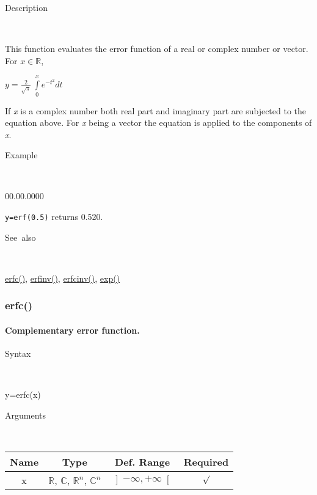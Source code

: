 \begin{description}
\item [Description]~
\end{description}
This function evaluates the error function of a real or complex number
or vector. For $x\in\mathbb{R}$,

\medskip{}
$y={\displaystyle \frac{2}{\sqrt{\pi}}\,\int\limits _{0}^{x}e^{-t^{2}}dt}$
\medskip{}

If \textit{x} is a complex number both real part and imaginary
part are subjected to the equation above. For \textit{x} being a vector
the equation is applied to the components of \textit{x}.

\begin{description}
\item [Example]~
\end{description}
\begin{lyxlist}{00.00.0000}
\item [\texttt{y=erf(0.5)}]returns 0.520.
\end{lyxlist}
\begin{description}
\item [See~also]~
\end{description}
\textcolor{blue}{\hyperlink{erfc}{erfc()}}\textcolor{black}{,} \textcolor{blue}{\hyperlink{erfinv}{erfinv()}}\textcolor{black}{,}
\textcolor{blue}{\hyperlink{erfcinv}{erfcinv()}}\textcolor{black}{,}
\textcolor{blue}{\hyperlink{exp}{exp()}}


\newpage
\subsubsection*{\hypertarget{erfc}{}{\Large erfc()}}


\paragraph{\label{par:Complementary-error-function}Complementary error function.}

\begin{description}
\item [Syntax]~
\end{description}
y=erfc(x)

\begin{description}
\item [Arguments]~
\end{description}
\begin{tabular}{|c|c|c|c|}
\hline 
Name&
Type&
Def. Range&
Required\tabularnewline
\hline
\hline 
x&
$\mathbb{R}$, $\mathbb{C}$, $\mathbb{R}^{n}$, $\mathbb{C}^{n}$&
$\left]-\infty,+\infty\right[$&
$\surd$\tabularnewline
\hline
\end{tabular}

